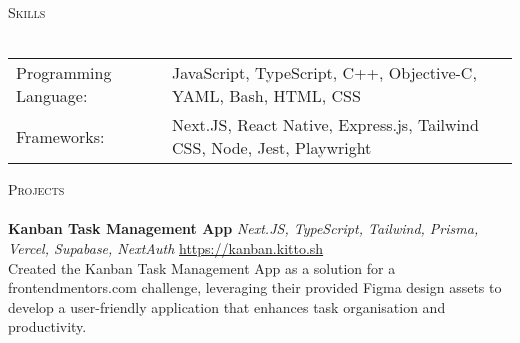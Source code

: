 \documentclass[a4paper]{article}
\newcommand{\lineunder} {
    \vspace*{-8pt} \\
    \hspace*{-18pt} \hrulefill \\
}
\newcommand{\header} [1] {
    {\hspace*{-18pt}\vspace*{6pt} \textsc{#1}}
    \vspace*{-6pt} \lineunder
}
\begin{document}
\header{Skills}
\begin{tabular}{V{5cm} @{\hskip 0.6cm} V{12cm}}
Programming Language: & JavaScript, TypeScript, C++, Objective-C, YAML, Bash, HTML, CSS \\
Frameworks: & Next.JS, React Native, Express.js, Tailwind CSS, Node, Jest, Playwright \\
\end{tabular}
\vspace{2mm}

\header{Projects}
      {\textbf{Kanban Task Management App}} {\sl Next.JS, TypeScript, Tailwind, Prisma, Vercel, Supabase, NextAuth} \hfill \url{https://kanban.kitto.sh}\\
Created the Kanban Task Management App as a solution for a frontendmentors.com challenge, leveraging their provided Figma design assets to develop a user-friendly application that enhances task organisation and productivity.\\
\vspace*{2mm}

    
\end{document}
